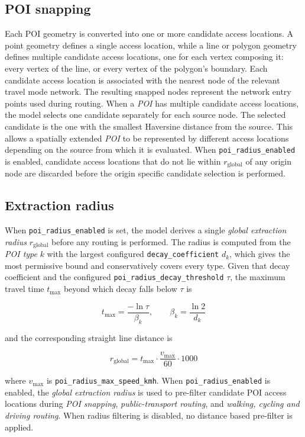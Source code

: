 \documentclass{article}
\begin{document}
\subsection{POI snapping}
Each POI geometry is converted into one or more candidate access locations. A point geometry defines a single access location, while a line or polygon geometry defines multiple candidate access locations, one for each vertex composing it: every vertex of the line, or every vertex of the polygon's boundary. Each candidate access location is associated with the nearest node of the relevant travel mode network. The resulting snapped nodes represent the network entry points used during routing. When a \emph{POI} has multiple candidate access locations, the model selects one candidate separately for each source node. The selected candidate is the one with the smallest Haversine distance from the source. This allows a spatially extended \emph{POI} to be represented by different access locations depending on the source from which it is evaluated. When \texttt{poi\_radius\_enabled} is enabled, candidate access locations
that do not lie within \(r_{\text{global}}\) of any origin node are discarded
before the origin specific candidate selection is performed.
\subsection{Extraction radius}
When \texttt{poi\_radius\_enabled} is set, the model derives a single
\emph{global extraction radius} $r_{\text{global}}$ before any routing is
performed. The radius is computed from the \emph{POI type} $k$ with the largest
configured \texttt{decay\_coefficient} $d_k$, which gives the most permissive bound
and conservatively covers every type. Given that decay coefficient and the
configured \texttt{poi\_radius\_decay\_threshold} $\tau$, the maximum travel
time $t_{\max}$ beyond which decay falls below $\tau$ is

\begin{equation}
    t_{\max} = \frac{-\ln \tau}{\beta_k}, \qquad \beta_k = \frac{\ln 2}{d_k}
\end{equation}

\noindent and the corresponding straight line distance is

\begin{equation}
    r_{\text{global}} = t_{\max} \cdot \frac{v_{\max}}{60} \cdot 1000
\end{equation}

\noindent where $v_{\max}$ is \texttt{poi\_radius\_max\_speed\_kmh}.
When \texttt{poi\_radius\_enabled} is enabled, the \emph{global extraction
radius} is used to pre-filter candidate POI access locations during
\emph{POI snapping}, \emph{public-transport routing}, and
\emph{walking, cycling and driving routing}. When radius filtering is
disabled, no distance based pre-filter is applied.
\end{document}
